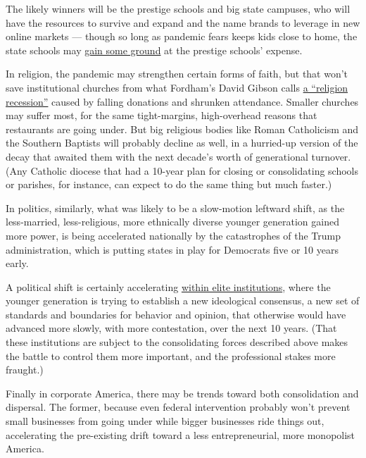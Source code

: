 The likely winners will be the prestige schools and big state campuses,
who will have the resources to survive and expand and the name brands to
leverage in new online markets --- though so long as pandemic fears
keeps kids close to home, the state schools may
\href{https://www.nytimes3xbfgragh.onion/2020/06/22/us/coronavirus-universities-brain-drain.html?searchResultPosition=1}{gain
some ground} at the prestige schools' expense.

In religion, the pandemic may strengthen certain forms of faith, but
that won't save institutional churches from what Fordham's David Gibson
calls
\href{https://religionandpolitics.org/2020/06/23/the-coming-religion-recession/}{a
``religion recession''} caused by falling donations and shrunken
attendance. Smaller churches may suffer most, for the same
tight-margins, high-overhead reasons that restaurants are going under.
But big religious bodies like Roman Catholicism and the Southern
Baptists will probably decline as well, in a hurried-up version of the
decay that awaited them with the next decade's worth of generational
turnover. (Any Catholic diocese that had a 10-year plan for closing or
consolidating schools or parishes, for instance, can expect to do the
same thing but much faster.)

In politics, similarly, what was likely to be a slow-motion leftward
shift, as the less-married, less-religious, more ethnically diverse
younger generation gained more power, is being accelerated nationally by
the catastrophes of the Trump administration, which is putting states in
play for Democrats five or 10 years early.

A political shift is certainly accelerating
\href{https://www.nytimes3xbfgragh.onion/2020/06/12/opinion/nyt-tom-cotton-oped-liberalism.html}{within
elite institutions}, where the younger generation is trying to establish
a new ideological consensus, a new set of standards and boundaries for
behavior and opinion, that otherwise would have advanced more slowly,
with more contestation, over the next 10 years. (That these institutions
are subject to the consolidating forces described above makes the battle
to control them more important, and the professional stakes more
fraught.)

Finally in corporate America, there may be trends toward both
consolidation and dispersal. The former, because even federal
intervention probably won't prevent small businesses from going under
while bigger businesses ride things out, accelerating the pre-existing
drift toward a less entrepreneurial, more monopolist America.

